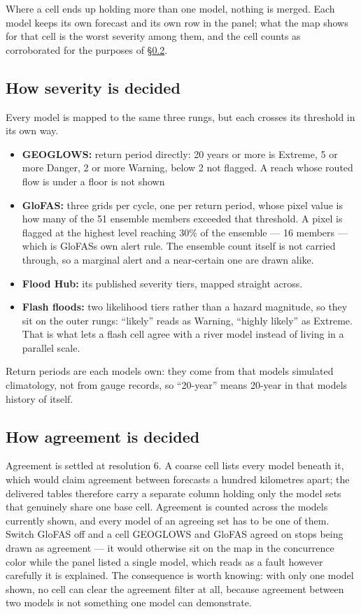 Where a cell ends up holding more than one model, nothing is merged.
Each model keeps its own forecast and its own row in the panel; what the map shows for that cell is the worst severity among them, and the cell counts as corroborated for the purposes of \S\ref{how-agreement-is-decided}.

\subsection{How severity is decided}\label{how-severity-is-decided}

Every model is mapped to the same three rungs, but each crosses its threshold in its own way.

\begin{itemize}
\item
  \textbf{GEOGLOWS:} return period directly: 20 years or more is Extreme, 5 or more Danger, 2 or more Warning, below 2 not flagged. A reach whose routed flow is under a floor is not shown
\item
  \textbf{GloFAS:} three grids per cycle, one per return period, whose pixel value is how many of the 51 ensemble members exceeded that threshold. A pixel is flagged at the highest level reaching 30\% of the ensemble --- 16 members --- which is GloFAS\textquotesingle s own alert rule. The ensemble count itself is not carried through, so a marginal alert and a near-certain one are drawn alike.
\item
  \textbf{Flood Hub:} its published severity tiers, mapped straight across.
\item
  \textbf{Flash floods:} two likelihood tiers rather than a hazard magnitude, so they sit on the outer rungs: ``likely'' reads as Warning, ``highly likely'' as Extreme. That is what lets a flash cell agree with a river model instead of living in a parallel scale.
\end{itemize}

Return periods are each model\textquotesingle s own: they come from that model\textquotesingle s simulated climatology, not from gauge records, so ``20-year'' means 20-year in that model\textquotesingle s history of itself.

\subsection{How agreement is decided}\label{how-agreement-is-decided}

Agreement is settled at resolution 6. A coarse cell lists every model beneath it, which would claim agreement between forecasts a hundred kilometres apart; the delivered tables therefore carry a separate column holding only the model sets that genuinely share one base cell.
Agreement is counted across the models currently shown, and every model of an agreeing set has to be one of them.
Switch GloFAS off and a cell GEOGLOWS and GloFAS agreed on stops being drawn as agreement --- it would otherwise sit on the map in the concurrence color while the panel listed a single model, which reads as a fault however carefully it is explained.
The consequence is worth knowing: with only one model shown, no cell can clear the agreement filter at all, because agreement between two models is not something one model can demonstrate.

